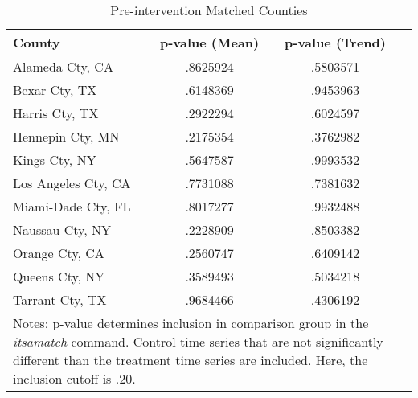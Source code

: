 \begin{table}[htbp]\centering
\def\sym#1{\ifmmode^{#1}\else\(^{#1}\)\fi}
\caption{\centering Pre-intervention Matched Counties}
\begin{adjustbox}{max width=\linewidth}\begin{tabular}{l*{3}{c}}
\toprule
            County  &   p-value (Mean)  &   p-value (Trend)\\
\midrule
Alameda Cty, CA   & .8625924   &    .5803571 \\
Bexar Cty, TX   & .6148369   &    .9453963 \\
Harris Cty, TX   & .2922294   &    .6024597 \\
Hennepin Cty, MN   & .2175354   &    .3762982 \\ 
Kings Cty, NY   & .5647587   &    .9993532 \\
Los Angeles Cty, CA   & .7731088   &    .7381632 \\
Miami-Dade Cty, FL   & .8017277   &    .9932488 \\
Naussau Cty, NY   & .2228909   &    .8503382 \\
Orange Cty, CA  & .2560747   &    .6409142 \\
Queens Cty, NY   & .3589493   &    .5034218 \\
Tarrant Cty, TX   & .9684466   &    .4306192 \\
\bottomrule
\multicolumn{3}{p{10cm}}{\footnotesize Notes: p-value determines inclusion in comparison group in the \textit{itsamatch} command. Control time series that are not significantly different than the treatment time series are included. Here, the inclusion cutoff is .20. }\\
\end{tabular} \end{adjustbox}
\end{table}